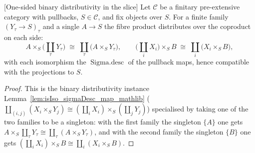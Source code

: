 \begin{lemma}

[One-sided binary distributivity in the slice]
  \label{lem:prod_coproduct_distrib}
  Let \(\mathcal{C}\) be a finitary pre-extensive category with pullbacks, \(S \in \mathcal{C}\), and
  fix objects over \(S\). For a finite family \((Y_\tau \to S)_\tau\) and a single \(A \to S\) the
  fibre product distributes over the coproduct on each side:
  \[
    A \times_S \bigl(\textstyle\coprod_{\tau} Y_\tau\bigr)
      \;\cong\;
    \coprod_{\tau} \bigl(A \times_S Y_\tau\bigr),
    \qquad
    \bigl(\textstyle\coprod_{i} X_i\bigr) \times_S B
      \;\cong\;
    \coprod_{i} \bigl(X_i \times_S B\bigr),
  \]
  with each isomorphism the \(\operatorname{Sigma.desc}\) of the pullback maps, hence compatible with
  the projections to \(S\).
\end{lemma}
\begin{proof}
  This is the binary distributivity instance Lemma~\ref{lem:isIso_sigmaDesc_map_mathlib}
  (\(\coprod_{(i,j)}(X_i \times_S Y_j) \cong (\coprod_i X_i)\times_S(\coprod_j Y_j)\)) specialised by
  taking one of the two families to be a singleton: with the first family the singleton \(\{A\}\)
  one gets \(A \times_S \coprod_\tau Y_\tau \cong \coprod_\tau (A \times_S Y_\tau)\), and with the
  second family the singleton \(\{B\}\) one gets \((\coprod_i X_i)\times_S B \cong \coprod_i (X_i
  \times_S B)\).
\end{proof}

